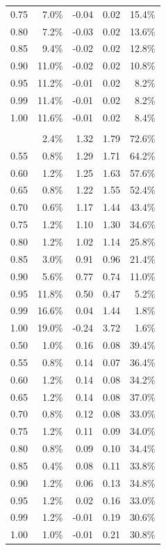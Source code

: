 \documentclass[
  letterpaper,
  DIV=11,
  numbers=noendperiod]{scrartcl}
\begin{document}
\begin{table}
{\begin{tabular*}{\linewidth}{@{\extracolsep{\fill}}rrrrr}
0.75 & 7.0\% & -0.04 & 0.02 & 15.4\% \\ 
0.80 & 7.2\% & -0.03 & 0.02 & 13.6\% \\ 
0.85 & 9.4\% & -0.02 & 0.02 & 12.8\% \\ 
0.90 & 11.0\% & -0.02 & 0.02 & 10.8\% \\ 
0.95 & 11.2\% & -0.01 & 0.02 & 8.2\% \\ 
0.99 & 11.4\% & -0.01 & 0.02 & 8.2\% \\ 
1.00 & 11.6\% & -0.01 & 0.02 & 8.4\% \\ 
\midrule\addlinespace[2.5pt]
\multicolumn{5}{l}{E} \\[2.5pt] 
\midrule\addlinespace[2.5pt]
0.50 & 2.4\% & 1.32 & 1.79 & 72.6\% \\ 
0.55 & 0.8\% & 1.29 & 1.71 & 64.2\% \\ 
0.60 & 1.2\% & 1.25 & 1.63 & 57.6\% \\ 
0.65 & 0.8\% & 1.22 & 1.55 & 52.4\% \\ 
0.70 & 0.6\% & 1.17 & 1.44 & 43.4\% \\ 
0.75 & 1.2\% & 1.10 & 1.30 & 34.6\% \\ 
0.80 & 1.2\% & 1.02 & 1.14 & 25.8\% \\ 
0.85 & 3.0\% & 0.91 & 0.96 & 21.4\% \\ 
0.90 & 5.6\% & 0.77 & 0.74 & 11.0\% \\ 
0.95 & 11.8\% & 0.50 & 0.47 & 5.2\% \\ 
0.99 & 16.6\% & 0.04 & 1.44 & 1.8\% \\ 
1.00 & 19.0\% & -0.24 & 3.72 & 1.6\% \\ 
0.50 & 1.0\% & 0.16 & 0.08 & 39.4\% \\ 
0.55 & 0.8\% & 0.14 & 0.07 & 36.4\% \\ 
0.60 & 1.2\% & 0.14 & 0.08 & 34.2\% \\ 
0.65 & 1.2\% & 0.14 & 0.08 & 37.0\% \\ 
0.70 & 0.8\% & 0.12 & 0.08 & 33.0\% \\ 
0.75 & 1.2\% & 0.11 & 0.09 & 34.0\% \\ 
0.80 & 0.8\% & 0.09 & 0.10 & 34.4\% \\ 
0.85 & 0.4\% & 0.08 & 0.11 & 33.8\% \\ 
0.90 & 1.2\% & 0.06 & 0.13 & 34.8\% \\ 
0.95 & 1.2\% & 0.02 & 0.16 & 33.0\% \\ 
0.99 & 1.2\% & -0.01 & 0.19 & 30.6\% \\ 
1.00 & 1.0\% & -0.01 & 0.21 & 30.8\% \\ 

\end{tabular*}}
\end{table}
\end{document}
